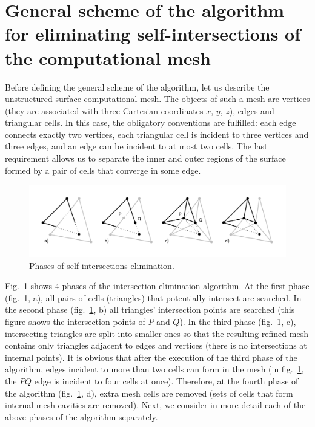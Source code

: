 \documentclass[
11pt,%
tightenlines,%
twoside,%
onecolumn,%
nofloats,%
nobibnotes,%
nofootinbib,%
superscriptaddress,%
noshowpacs,%
centertags]%
{revtex4}
\begin{document}
\section{General scheme of the algorithm for eliminating self-intersections of the computational mesh}

Before defining the general scheme of the algorithm, let us describe the unstructured surface computational mesh.
The objects of such a mesh are vertices (they are associated with three Cartesian coordinates $x$, $y$, $z$), edges and triangular cells.
In this case, the obligatory conventions are fulfilled: each edge connects exactly two vertices, each triangular cell is incident to three vertices and three edges, and an edge can be incident to at most two cells.
The last requirement allows us to separate the inner and outer regions of the surface formed by a pair of cells that converge in some edge.

\begin{figure}[h]
\includegraphics[width=1.0\textwidth]{pics/pic_algorithm_phases_s.pdf}
\caption{Phases of self-intersections elimination.}\label{fig:pic_algorithm_phases_s}
\end{figure}

Fig.~\ref{fig:pic_algorithm_phases_s} shows 4 phases of the intersection elimination algorithm.
At the first phase (fig.~\ref{fig:pic_algorithm_phases_s}, a), all pairs of cells (triangles) that potentially intersect are searched.
In the second phase (fig.~\ref{fig:pic_algorithm_phases_s}, b) all triangles' intersection points are searched (this figure shows the intersection points of $P$ and $Q$).
In the third phase (fig.~\ref{fig:pic_algorithm_phases_s}, c), intersecting triangles are split into smaller ones so that the resulting refined mesh contains only triangles adjacent to edges and vertices (there is no intersections at internal points).
It is obvious that after the execution of the third phase of the algorithm, edges incident to more than two cells can form in the mesh (in fig.~\ref{fig:pic_algorithm_phases_s}, the $PQ$ edge is incident to four cells at once).
Therefore, at the fourth phase of the algorithm (fig.~\ref{fig:pic_algorithm_phases_s}, d), extra mesh cells are removed (sets of cells that form internal mesh cavities are removed).
Next, we consider in more detail each of the above phases of the algorithm separately.
\end{document}
